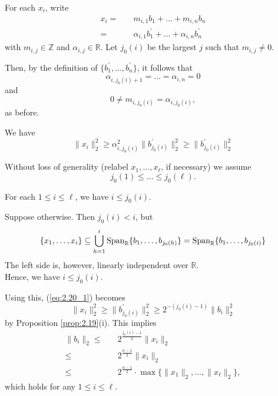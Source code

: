 \documentclass{Vorlesungstemplate_English} %
\begin{document}
\begin{pf}
For each $x_{i}$, write
\begin{align*} x_{i} = \quad & m_{i,1}b_{1} + \dots + m_{i,n}b_{n} \\
 = \quad & \alpha_{i,1}b_{1}^{\prime} + \dots + \alpha_{i,n}b_{n}^{\prime} \end{align*}
with $m_{i,j} \in \mathbb{Z}$ and $\alpha_{i,j} \in \mathbb{R}.$
Let $j_{0}(i)$ be the largest $j$ such that $m_{i,j} \neq 0$.


Then, by the definition of $\{b_{1}^{\prime}, \dots, b_{n}^{\prime}\}$, it follows that
\[ \alpha_{i, j_{0}(i)+1} = \dots = \alpha_{i,n} = 0 \]
and
\[ 0 \neq m_{i, j_{0}(i)} = \alpha_{i, j_{0}(i)},\]
as before.

We have
\begin{equation}\label{eq:2.20_1} \|x_{i}\|_{2}^{2} \ge \alpha_{i, j_{0}(i)}^{2} \|b_{j_{0}(i)}^{\prime}\|_{2}^{2} \ge \|b_{j_{0}(i)}^{\prime}\|_{2}^{2} \tag{1} \end{equation}

Without loss of generality (relabel $x_{1}, \dots, x_{\ell}$, if necessary) we assume
\[ j_{0}(1) \le \dots \le j_{0}(\ell). \]



\begin{claim*}{} For each $1 \le i \le \ell$, we have $i \le j_{0}(i)$.
\end{claim*}

Suppose otherwise. Then $j_{0}(i) < i$, but
\[ \{x_{1}, \dots, x_{i}\} \subseteq \bigcup_{h=1}^{i} \text{Span}_{\mathbb{R}}\{b_{1}, \dots, b_{j_{0}(h)}\} = \text{Span}_{\mathbb{R}}\{b_{1}, \dots, b_{j_{0}(i)}\} \]
The left side is, however, linearly independent over $\mathbb{R}$. \Lightning \\
Hence, we have $i \le j_{0}(i)$.

Using this, (\ref{eq:2.20_1}) becomes
\[ \|x_{i}\|_{2}^{2} \ge \|b_{j_{0}(i)}^{\prime}\|_{2}^{2} \ge 2^{-(j_{0}(i)-1)} \|b_{i}\|_{2}^{2} \]
by Proposition \ref{prop:2.19}(i).
This implies
\begin{align*} \|b_{i}\|_{2} \le \quad & 2^{\frac{j_{0}(i)-1}{2}} \|x_{i}\|_{2} \\
\le \quad & 2^{\frac{n-1}{2}} \|x_{i}\|_{2} \\
\le \quad & 2^{\frac{n-1}{2}} \cdot \max \{ \|x_{1}\|_{2}, \dots, \|x_{\ell}\|_{2} \},
\end{align*}
which holds for any $1 \le i \le \ell$.
\end{pf}
\end{document}
